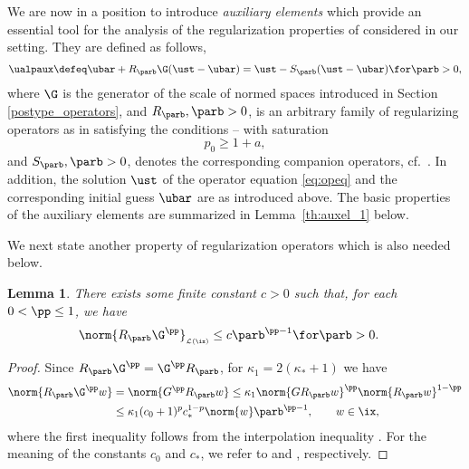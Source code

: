 \documentclass[10pt]{article}
\newtheorem{lemma}[theorem]{Lemma}
\theoremstyle{definition}
\begin{document}
%
We are now in a position to introduce \emph{auxiliary elements}
which provide an essential tool for the analysis of the regularization properties of \tikreg considered in our setting.
They are defined as follows,
%
\begin{align}
\ualpaux \defeq \ubar + R_\parb \G (\ust-\ubar)
=
\ust - S_\parb(\ust-\ubar)
\for \parb > 0,
\label{eq:uaux-def}
\end{align}
%
where $\G$ is the generator of the scale of normed spaces introduced in Section \ref{postype_operators}, and $ R_\parb, \parb > 0 $, is an arbitrary family of regularizing operators as in  satisfying the conditions --
with saturation
%
$$ p_0 \ge 1+a, $$
%
and $ S_\parb, \parb > 0 $, denotes the corresponding companion operators, cf.~.
In addition,
the solution $ \ust$ of the operator equation \eqref{eq:opeq} and the corresponding initial guess $\ubar $ are as introduced above.
The basic properties of the auxiliary elements  are summarized in Lemma~\ref{th:auxel_1} below.
%

We next state another property of regularization operators which is also needed below.
%
\begin{lemma}
\label{th:auxel_0}
There exists some finite constant $ c > 0  $ such that, for each $ 0 < \pp \le 1$, we have
%
\begin{align*}
\norm{ R_\parb \G^\pp }_{\scriptscriptstyle \mathcal{L}(\ix)} & \le c \parb^{\pp-1} \for \parb > 0.
\end{align*}
\end{lemma}
%
\begin{proof}
Since $ R_\parb \G^\pp = \G^\pp R_\parb $, for
$ \kappa_1 = 2(\kappa_*+1) $
we have
%
\begin{align*}
\norm{ R_\parb \G^\pp w } & =
\norm{ G^\pp R_\parb w } \le \kappa_1 \norm{ G R_\parb w }^\pp \norm{ R_\parb w }^{1-\pp}
\\
& \le
\kappa_1(c_0+1)^p c_*^{1-p} \norm{ w } \parb^{\pp-1}, \qquad w \in \ix,
\end{align*}
%
where the first inequality follows from the interpolation inequality .
For the meaning of the constants $ c_0 $ and $ c_* $, we refer to
 and , respectively.
\end{proof}
%
%
%
\end{document}
